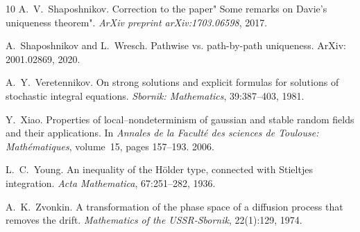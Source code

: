\documentclass[10pt]{article}
\newcommand{\tmtextit}[1]{{\itshape{#1}}}
\begin{document}
\begin{thebibliography}{10}
  A.~V.~Shaposhnikov. {\newblock}Correction to the
  paper" Some remarks on Davie's uniqueness theorem".
  {\newblock}\tmtextit{ArXiv preprint arXiv:1703.06598}, 2017.{\newblock}
  
  A.~Shaposhnikov  and  L.~Wresch.
  {\newblock}Pathwise vs. path-by-path uniqueness. {\newblock}ArXiv:
  2001.02869, 2020.{\newblock}
  
  A.~Y.~Veretennikov. {\newblock}On strong solutions
  and explicit formulas for solutions of stochastic integral equations.
  {\newblock}\tmtextit{Sbornik: Mathematics}, 39:387--403, 1981.{\newblock}
  
  Y.~Xiao. {\newblock}Properties of local--nondeterminism of
  gaussian and stable random fields and their applications. {\newblock}In
  \tmtextit{Annales de la Facult{\'e} des sciences de Toulouse:
  Math{\'e}matiques},  volume~15,  pages  157--193. 2006.{\newblock}
  
  L.~C.~Young. {\newblock}An inequality of the H{\"o}lder
  type, connected with Stieltjes integration. {\newblock}\tmtextit{Acta
  Mathematica}, 67:251--282, 1936.{\newblock}
  
  A.~K.~Zvonkin. {\newblock}A transformation of the phase
  space of a diffusion process that removes the drift.
  {\newblock}\tmtextit{Mathematics of the USSR-Sbornik}, 22(1):129,
  1974.{\newblock}
\end{thebibliography}
\end{document}
